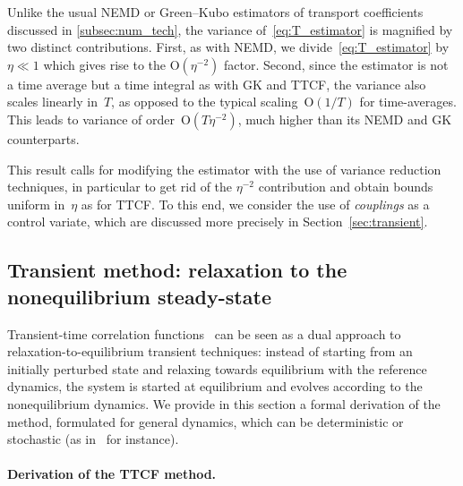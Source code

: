 \documentclass[11pt]{article}
\newcommand{\bigO}{\mathrm{O}}
\theoremstyle{definition}
\let\oldparagraph=\paragraph
\renewcommand\paragraph[1]{\oldparagraph{#1.}}
\begin{document}
Unlike the usual NEMD or Green--Kubo estimators of transport coefficients discussed in \cref{subsec:num_tech}, the variance of~\eqref{eq:T_estimator} is magnified by two distinct contributions. First, as with NEMD, we divide~\eqref{eq:T_estimator} by $\eta\ll 1$ which gives rise to the $\bigO(\eta^{-2})$ factor. Second, since the estimator is not a time average but a time integral as with GK and TTCF, the variance also scales linearly in~$T$, as opposed to the typical scaling~$\bigO(1/T)$ for time-averages. This leads to variance of order~$\bigO(T\eta^{-2})$, much higher than its NEMD and GK counterparts. 

This result calls for modifying the estimator with the use of variance reduction techniques, in particular to get rid of the $\eta^{-2}$ contribution and obtain bounds uniform in~$\eta$ as for TTCF. To this end, we consider the use of \emph{couplings} as a control variate, which are discussed more precisely in Section~\ref{sec:transient}.

\subsection{Transient method: relaxation to the nonequilibrium steady-state}
\label{subsec:TTCF}

Transient-time correlation functions~\cite{morriss1987,evans1988} can be seen as a dual approach to relaxation-to-equilibrium transient techniques: instead of starting from an initially perturbed state and relaxing towards equilibrium with the reference dynamics, the system is started at equilibrium and evolves according to the nonequilibrium dynamics. We provide in this section a formal derivation of the method, formulated for general dynamics, which can be deterministic or stochastic (as in~\cite{pincus2023} for instance).

\paragraph{Derivation of the TTCF method}
\end{document}

